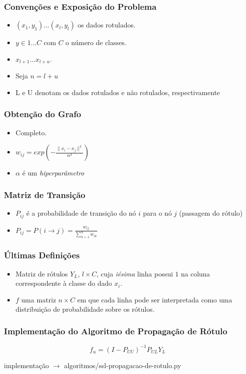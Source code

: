 \documentclass{beamer}
\begin{document}
      \frame
      {
        \frametitle{Convenções e Exposição do Problema}
        \begin{itemize}
          \item ${(x_1,y_1)...(x_l,y_l)}$ os dados rotulados.
          \item $y \in {1...C}$ com $C$ o número de classes.
          \item ${x_{l+1}...x_{l+u}}$.
          \item Seja $n = l + u$
          \item L e U denotam os dados rotulados e não rotulados, respectivamente
        \end{itemize}
      }

      \frame
      {
        \frametitle{Obtenção do Grafo}
        \begin{itemize}
          \item Completo.
          \item $w_{ij} = exp( -\frac{\| x_i - x_j \|^2}{\alpha^2} )$
          \item $\alpha$ é um \emph{hiperparâmetro}
        \end{itemize}
      }  

      \frame
      {
        \frametitle{Matriz de Transição}
        \begin{itemize}
          \item $P_{ij}$ é a probabilidade de transição do nó $i$ para o nó $j$ (passagem do rótulo)
          \item $P_{ij} = P(i \rightarrow j) = \frac{w_{ij}}{\sum_{k=1}^{n}w_{ik}}$
        \end{itemize}
      }

      \frame
      {
        \frametitle{Últimas Definições}
        \begin{itemize}
          \item Matriz de rótulos $Y_L$, $l \times C$, cuja \emph{iésima} linha possui $1$ na coluna correspondente à classe do dado $x_i$.
          \item $f$ uma matriz $n \times C$ em que cada linha pode ser interpretada como uma distribuição de probabilidade sobre os rótulos.
        \end{itemize}
      }
      \frame
      {
        \frametitle{Implementação do Algoritmo de Propagação de Rótulo}
\begin{equation}
  f_u = (I - P_{UU})^{-1}P_{UL}Y_{L}
\end{equation}

        \begin{center}
        implementação $\rightarrow$ algoritmos/ssl-propagacao-de-rotulo.py
        \end{center}
      }
\end{document}
